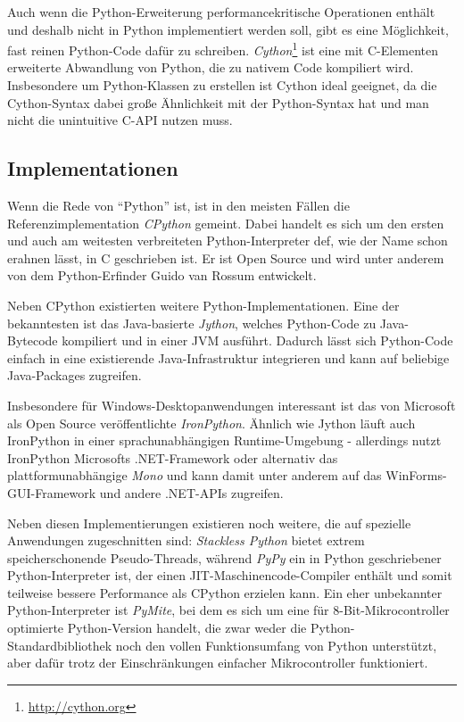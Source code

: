

Auch wenn die Python-Erweiterung performancekritische Operationen enthält und deshalb nicht in
Python implementiert werden soll, gibt es eine Möglichkeit, fast reinen Python-Code dafür zu
schreiben. \emph{Cython}\footnote{\href{http://cython.org}{http://cython.org}} ist eine mit
C-Elementen erweiterte Abwandlung von Python, die zu nativem Code kompiliert wird. Insbesondere um
Python-Klassen zu erstellen ist Cython ideal geeignet, da die Cython-Syntax dabei große Ähnlichkeit
mit der Python-Syntax hat und man nicht die unintuitive C-API nutzen muss.


\subsection{Implementationen}

Wenn die Rede von \enquote{Python} ist, ist in den meisten Fällen die Referenzimplementation
\emph{CPython} gemeint. Dabei handelt es sich um den ersten und auch am weitesten verbreiteten
Python-Interpreter def, wie der Name schon erahnen lässt, in C geschrieben ist. Er ist Open Source
und wird unter anderem von dem Python-Erfinder Guido van Rossum entwickelt.

Neben CPython existierten weitere Python-Implementationen. Eine der bekanntesten ist das
Java-basierte \emph{Jython}, welches Python-Code zu Java-Bytecode kompiliert und in einer JVM
ausführt. Dadurch lässt sich Python-Code einfach in eine existierende Java-Infrastruktur integrieren
und kann auf beliebige Java-Packages zugreifen.

Insbesondere für Windows-Desktopanwendungen interessant ist das von Microsoft als Open Source
veröffentlichte \emph{IronPython}. Ähnlich wie Jython läuft auch IronPython in einer
sprachunabhängigen Runtime-Umgebung - allerdings nutzt IronPython Microsofts .NET-Framework oder
alternativ das plattformunabhängige \emph{Mono} und kann damit unter anderem auf das
WinForms-GUI-Framework und andere .NET-APIs zugreifen.

Neben diesen Implementierungen existieren noch weitere, die auf spezielle Anwendungen zugeschnitten
sind: \emph{Stackless Python} bietet extrem speicherschonende Pseudo-Threads, während \emph{PyPy}
ein in Python geschriebener Python-Interpreter ist, der einen
JIT-Maschinencode-Compiler enthält und somit teilweise bessere Performance als CPython erzielen
kann. Ein eher unbekannter Python-Interpreter ist \emph{PyMite}, bei dem es sich um eine für
8-Bit-Mikrocontroller optimierte Python-Version handelt, die zwar weder die
Python-Standardbibliothek noch den vollen Funktionsumfang von Python unterstützt, aber dafür trotz
der Einschränkungen einfacher Mikrocontroller funktioniert.


